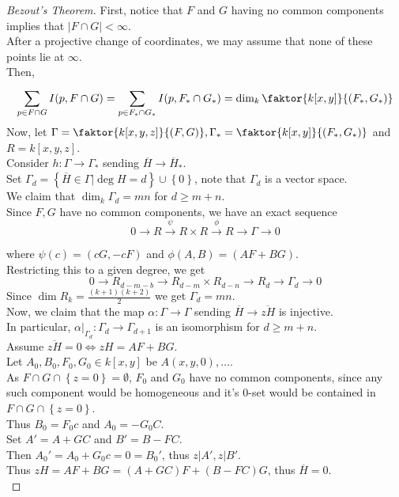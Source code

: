 \documentclass[../main.tex]{subfiles}
\begin{document}
\begin{proof}[Bezout's Theorem]
First, notice that $F$ and $G$ having no common components implies that $|F\cap G| < \infty $.\\
After a projective change of coordinates, we may assume that none of these points lie at $ \infty $.\\
Then,
\[ 
	\sum_{p\in F\cap G}^{ } I( p,F\cap G) = \sum_{ p \in F_\ast \cap G_\ast}^{ } I( p, F_\ast\cap G_\ast) = \dim_k \faktor{k[x,y]}{( F_\ast,G_\ast) }	
\]
Now, let $\Gamma = \faktor{ k[x,y,z]}{ ( F,G) }, \Gamma_\ast = \faktor{k[x,y]}{( F_\ast,G_\ast) }$ and $R= k[x,y,z]$.\\
Consider $h:\Gamma\to \Gamma_\ast$ sending $\overline{H}\to \overline{H}_\ast$.\\
Set $\Gamma_d = \left\{ \overline{H}\in \Gamma| \deg H =d \right\} \cup \left\{ 0 \right\} $, note that $\Gamma_d$ is a vector space.\\
We claim that $\dim_k \Gamma_d = mn$ for $d \geq m+n$.\\
Since $F,G$ have no common components, we have an exact sequence
\[ 
0\to	R\xrightarrow{\psi}R\times R \xrightarrow{\phi} R\to \Gamma \to 0
\]

where $\psi( c) =( cG, -cF) $ and $\phi( A,B) = ( AF+BG) $.\\
Restricting this to a given degree, we get
\[ 
0\to R_{d-m-b} \to R_{d-m} \times R_{d-n} \to R_d \to \Gamma_d \to 0
\]
Since $\dim R_k = \frac{( k+1) ( k+2) }{2}$ we get $\Gamma_d =mn$.\\

Now, we claim that the map $\alpha:\Gamma\to \Gamma$ sending $\overline{H}\to \overline{zH}$ is injective.\\
In particular, $\alpha|_{\Gamma_d} : \Gamma_d \to \Gamma_{d+1} $ is an isomorphism for $d \geq m+n$.\\
Assume $ \overline{zH}=0 \iff zH = AF+BG$.\\
Let $A_0,B_0,F_0,G_0\in k[x,y]$ be $A( x,y,0) ,\ldots$.\\
As $F\cap G\cap \left\{ z=0 \right\} = \emptyset$, $F_0$ and $G_0$ have no common components, since any such component would be homogeneous and it's $0$-set would be contained in $F\cap G\cap \left\{ z=0 \right\} $.\\
Thus $B_0= F_0c$ and $A_0= - G_0 C$.\\
Set $A'= A+ GC$ and $B'= B-FC$.\\
Then $A_0' = A_0+G_0c=0 = B_0'$, thus $z|A', z|B'$.\\
Thus $zH = AF+BG= ( A+GC)F+ ( B-FC) G$, thus $ \overline{H}=0$.\\


\end{proof}
\end{document}
